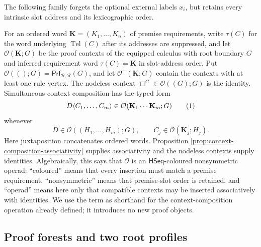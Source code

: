 \documentclass[10pt,a4paper]{article}
\theoremstyle{plain}
\theoremstyle{definition}
\theoremstyle{remark}
\newcommand{\Base}{\mathcal B}
\newcommand{\Rules}{\mathcal R}
\newcommand{\HSeq}{\mathsf{HSeq}}
\newcommand{\Tel}{\operatorname{Tel}}
\newcommand{\Prf}{\mathsf{Prf}}
\newcommand{\eqtag}{\refstepcounter{equation}\tag{\theequation}}
\begin{document}
The following family forgets the optional external labels \(x_i\), but
retains every intrinsic slot address and its lexicographic order.

For an ordered word
\(
\mathbf K=(K_1,\ldots,K_n)
\)
of premise requirements, write \(\tau(C)\) for the word underlying
\(\Tel(C)\) after its addresses are suppressed, and let
\(
\mathcal O(\mathbf K;G)
\)
be the proof contexts of the equipped calculus with root boundary \(G\) and
inferred requirement word \(\tau(C)=\mathbf K\) in slot-address order.  Put
\(\mathcal O(();G)=\Prf_{\Base,\Rules}(G)\), and let
\(\mathcal O^+(\mathbf K;G)\) contain the contexts with at least one rule
vertex.  The nodeless context
\(\Box^G\in\mathcal O((G);G)\) is the identity.  Simultaneous context
composition has the typed form
\[
 D\langle C_1,\ldots,C_m\rangle
 \in
 \mathcal O(\mathbf K_1\cdots\mathbf K_m;G)
\eqtag\label{eq:typed-context-composition}
\]
whenever
\[
 D\in\mathcal O((H_1,\ldots,H_m);G),
 \qquad
 C_j\in\mathcal O(\mathbf K_j;H_j).
\]
Here juxtaposition concatenates ordered words.  Proposition
\ref{prop:context-composition-associativity} supplies associativity and the nodeless
contexts supply identities.  Algebraically, this says that \(\mathcal O\)
is an \(\HSeq\)-coloured nonsymmetric operad: ``coloured'' means that every
insertion must match a premise requirement, ``nonsymmetric'' means that
premise-slot order is retained, and ``operad'' means here only
that compatible contexts may be inserted associatively with identities.
We use the term as shorthand for the context-composition operation already
defined; it introduces no new proof objects.

\subsection{Proof forests and two root profiles}
\end{document}
